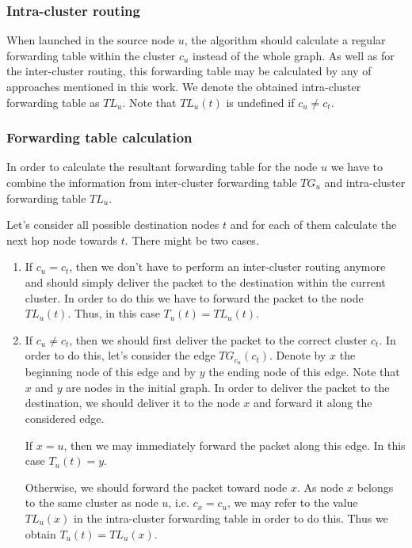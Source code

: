 \subsubsection{Intra-cluster routing}

When launched in the source node $u$, the algorithm should calculate a regular forwarding table within the cluster $c_u$ instead of the whole graph. As well as for the inter-cluster routing, this forwarding table may be calculated by any of approaches mentioned in this work. We denote the obtained intra-cluster forwarding table as $TL_u$. Note that $TL_u(t)$ is undefined if $c_u \neq c_t$.

\subsubsection{Forwarding table calculation}

In order to calculate the resultant forwarding table for the node $u$ we have to combine the information from inter-cluster forwarding table $TG_u$ and intra-cluster forwarding table $TL_u$.

Let's consider all possible destination nodes $t$ and for each of them calculate the next hop node towards $t$. There might be two cases.

\begin{enumerate}
\item If $c_u = c_t$, then we don't have to perform an inter-cluster routing anymore and should simply deliver the packet to the destination within the current cluster. In order to do this we have to forward the packet to the node $TL_u(t)$. Thus, in this case $T_u(t) = TL_u(t)$.
\item If $c_u \neq c_t$, then we should first deliver the packet to the correct cluster $c_t$. In order to do this, let's consider the edge $TG_{c_u}(c_t)$. Denote by $x$ the beginning node of this edge and by $y$ the ending node of this edge. Note that $x$ and $y$ are nodes in the initial graph. In order to deliver the packet to the destination, we should deliver it to the node $x$ and forward it along the considered edge.

If $x = u$, then we may immediately forward the packet along this edge. In this case $T_u(t) = y$.

Otherwise, we should forward the packet toward node $x$. As node $x$ belongs to the same cluster as node $u$, i.e. $c_x = c_u$, we may refer to the value $TL_u(x)$ in the intra-cluster forwarding table in order to do this. Thus we obtain $T_u(t) = TL_u(x)$.
\end{enumerate}

